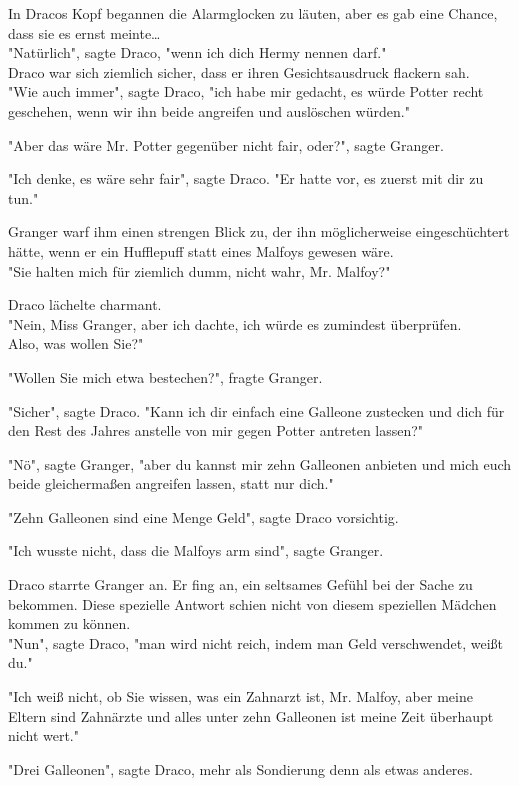 {In Dracos Kopf begannen die Alarmglocken zu läuten, aber es gab eine Chance, dass sie es ernst meinte…\\ "Natürlich", sagte Draco, "wenn ich dich Hermy nennen darf."\\ Draco war sich ziemlich sicher, dass er ihren Gesichtsausdruck flackern sah.\\ "Wie auch immer", sagte Draco, "ich habe mir gedacht, es würde Potter recht geschehen, wenn wir ihn beide angreifen und auslöschen würden."

"Aber das wäre Mr. Potter gegenüber nicht fair, oder?", sagte Granger.

"Ich denke, es wäre sehr fair", sagte Draco. "Er hatte vor, es zuerst mit dir zu tun."

Granger warf ihm einen strengen Blick zu, der ihn möglicherweise eingeschüchtert hätte, wenn er ein Hufflepuff statt eines Malfoys gewesen wäre.\\ "Sie halten mich für ziemlich dumm, nicht wahr, Mr. Malfoy?"

Draco lächelte charmant.\\ "Nein, Miss Granger, aber ich dachte, ich würde es zumindest überprüfen.\\ Also, was wollen Sie?"

"Wollen Sie mich etwa bestechen?", fragte Granger.

"Sicher", sagte Draco. "Kann ich dir einfach eine Galleone zustecken und dich für den Rest des Jahres anstelle von mir gegen Potter antreten lassen?"

"Nö", sagte Granger, "aber du kannst mir zehn Galleonen anbieten und mich euch beide gleichermaßen angreifen lassen, statt nur dich."

"Zehn Galleonen sind eine Menge Geld", sagte Draco vorsichtig.

"Ich wusste nicht, dass die Malfoys arm sind", sagte Granger.

Draco starrte Granger an. Er fing an, ein seltsames Gefühl bei der Sache zu bekommen. Diese spezielle Antwort schien nicht von diesem speziellen Mädchen kommen zu können.\\ "Nun", sagte Draco, "man wird nicht reich, indem man Geld verschwendet, weißt du."

"Ich weiß nicht, ob Sie wissen, was ein Zahnarzt ist, Mr. Malfoy, aber meine Eltern sind Zahnärzte und alles unter zehn Galleonen ist meine Zeit überhaupt nicht wert."

"Drei Galleonen", sagte Draco, mehr als Sondierung denn als etwas anderes.

}
